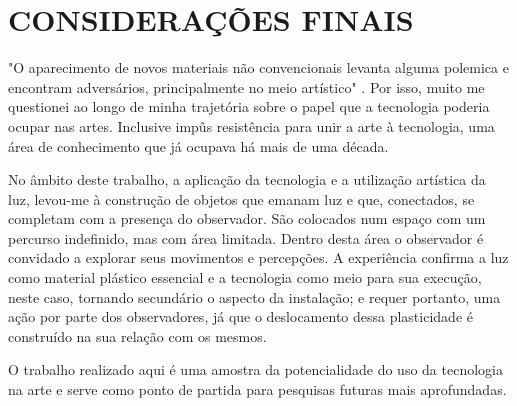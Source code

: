 \chapter{CONSIDERAÇÕES FINAIS}

"O aparecimento de novos materiais não convencionais levanta alguma polemica e encontram adversários, principalmente no meio artístico" \cite{azevedo}. Por isso, muito me questionei ao longo de minha trajetória sobre o papel que a tecnologia poderia ocupar nas artes. Inclusive impûs resistência para unir a arte à tecnologia, uma área de conhecimento que já ocupava há mais de uma década. 

No âmbito deste trabalho, a aplicação da tecnologia e a utilização artística da luz, levou-me à construção de objetos que emanam luz e que, conectados, se completam com a presença do observador. São colocados num espaço com um percurso indefinido, mas com área limitada. Dentro desta área o observador é convidado a explorar seus movimentos e percepções. A experiência confirma a luz como material plástico essencial e a tecnologia como meio para sua execução, neste caso, tornando secundário o aspecto da instalação; e requer portanto, uma ação por parte dos observadores, já que o deslocamento dessa plasticidade é construído na sua relação com os mesmos.

O trabalho realizado aqui é uma amostra da potencialidade do uso da tecnologia na arte e serve como ponto de partida para pesquisas futuras mais aprofundadas.
